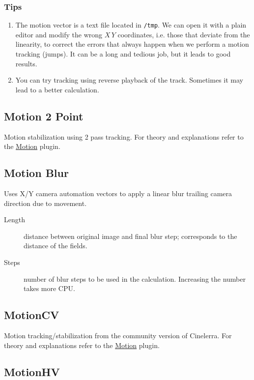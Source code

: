 \subsubsection*{Tips}
\label{ssub:tips}

\begin{enumerate}
    \item The motion vector is a text file located in \texttt{/tmp}. We can open it with a plain editor and modify the wrong $X\,Y$ coordinates, i.e. those that deviate from the linearity, to correct the errors that always happen when we perform a motion tracking (jumps). It can be a long and tedious job, but it leads to good results.
    \item You can try tracking using reverse playback of the track. Sometimes it may lead to a better calculation.
\end{enumerate}

\subsection{Motion 2 Point}%
\label{sub:motion_2_point}

Motion stabilization using 2 pass tracking. For theory and explanations refer to the \hyperref[sub:motion]{Motion} plugin.

\subsection{Motion Blur}%
\label{sub:motion_blur}

Uses X/Y camera automation vectors to apply a linear blur trailing camera direction due to movement.
\begin{description}
    \item[Length] distance between original image and final blur step; corresponds to the distance of the fields.
    \item[Steps] number of blur steps to be used in the calculation. Increasing the number takes more CPU.
\end{description}

\subsection{MotionCV}%
\label{sub:motioncv}

Motion tracking/stabilization from the community version of Cinelerra. For theory and explanations refer to the \hyperref[sub:motion]{Motion} plugin.

\subsection{MotionHV}%
\label{sub:motionhv}

